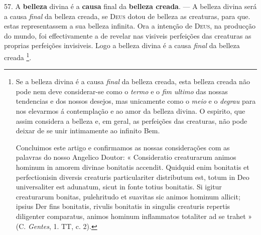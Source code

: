 57. A \textbf{belleza} divina é a \textbf{causa} final da \textbf{belleza creada}. --- A belleza divina será a causa \emph{final} da belleza creada, se \textsc{Deus} dotou de belleza as creaturas, para que. estas representassem a sua belleza infinita. Ora a intenção de \textsc{Deus}, na producção do mundo, foi effectivamente a de revelar nas visiveis perfeições das creaturas as proprias perfeições invisiveis. Logo a belleza divina é a causa \emph{final} da belleza creada \footnote{Se a belleza divina é a causa \emph{final} da belleza creada, esta belleza creada não pode nem deve considerar-se como o \emph{termo} e o \emph{fim ultimo} das nossas tendencias e dos nossos desejos, mas unicamente como o \emph{meio} e o \emph{degrau} para nos elevarmos á contemplação e ao amor da belleza divina. O espirito, que assim considera a belleza e, em geral, as perfeições das creaturas, não pode deixar de se unir intimamente ao infinito Bem.\par Concluimos este artigo e confirmamos as nossas considerações com as palavras do nosso Angelico Doutor: « Consideratio creaturarum animos hominum in amorem divinae bonitatis accendit. Quidquid enim bonitatis et perfectionisin diversis creaturis particulariter distributum est, totum in Deo universaliter est adunatum, sicut in fonte totius bonitatis. Si igitur creaturarum bonitas, pulehritudo et suavitas sic animos hominum allicit; ipsius Der fins bonitatis, rivulis bonitatis in singulis creaturis repertis diligenter comparatus, animos hominum inflammatos totaliter ad se trahet » (C. \emph{Gentes}, 1. TT, c. 2).}.


